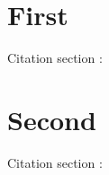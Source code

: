 \documentclass{article}
\begin{document}
\section{First}
\begin{refsection}
Citation section \thesection: \cite{knuth1986texbook}
\printbibliography[heading=bibliography]
\end{refsection}
\section{Second}
\begin{refsection}
Citation section \thesection: \cite{knuth1977fast}
\printbibliography[heading=bibliography]
\end{refsection}
\end{document}
